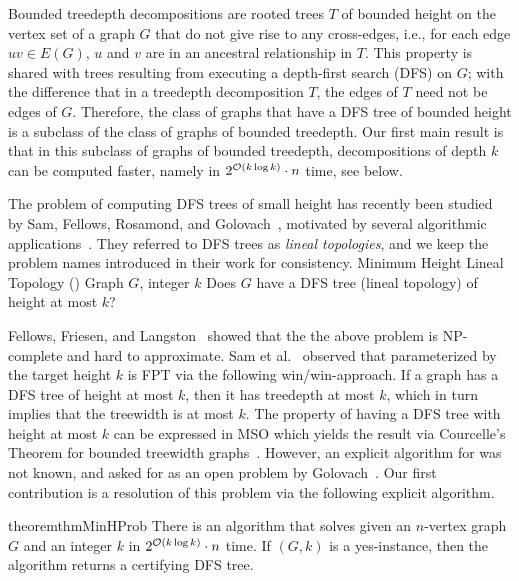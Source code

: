 \documentclass[a4paper,11pt]{article}
\begin{document}
Bounded treedepth decompositions are rooted trees $T$ of bounded height 
on the vertex set of a graph $G$ that do not give rise to any cross-edges, 
i.e., for each edge $uv \in E(G)$, $u$ and $v$ are in an ancestral relationship in $T$. 
This property is shared with trees resulting from executing a depth-first search (DFS) on $G$;
with the difference that in a treedepth decomposition $T$, the edges of $T$ need not be edges of $G$.
Therefore, the class of graphs that have a DFS tree of bounded height is a subclass of the class of graphs of bounded treedepth.
%
Our first main result is that in this subclass of graphs of bounded treedepth, 
decompositions of depth $k$ can be computed faster, 
namely in $2^{{\mathcal{O}}(k \log k)}\cdot n$ time, see below.

The problem of computing DFS trees of small height has recently been studied 
by Sam, Fellows, Rosamond, and Golovach~\cite{SamFRG23},
motivated by several algorithmic applications~\cite{BODLAENDER19931,downeyFellow2013,fellows1989Polytime,freuder1985}.
They referred to DFS trees as \emph{lineal topologies},
and we keep the problem names introduced in their work for consistency.
%
\fancyproblemdef
    {Minimum Height Lineal Topology (\MinHProb)}
    {Graph $G$, integer $k$}
    {Does $G$ have a DFS tree (lineal topology) of height at most $k$?}

Fellows, Friesen, and Langston~\cite{fellows1988} showed that the the above problem is NP-complete
and hard to approximate.
%
Sam et al.~\cite{SamFRG23} observed that \MinHProb parameterized by the target height $k$ is FPT via the following win/win-approach.
If a graph has a DFS tree of height at most $k$, then it has treedepth at most $k$, which in turn implies that the treewidth is at most $k$.
%
The property of having a DFS tree with height at most $k$ can be expressed in MSO which yields the result via Courcelle's Theorem for bounded treewidth graphs~\cite{Courcelle90}.
%
However, an explicit algorithm for \MinHProb was not known, and asked for as an open problem by Golovach~\cite{DagstuhlDrawing}.
Our first contribution is a resolution of this problem via the following explicit algorithm.
%
\begin{restatable}{theorem}{thmMinHProb}\label{thm:fpt-td2}
    There is an algorithm that solves \MinHProb 
    given an $n$-vertex graph $G$ and an integer $k$ 
    in $2^{{\mathcal{O}}(k \log k)} \cdot n$ time.
    If $(G, k)$ is a yes-instance, 
    then the algorithm returns a certifying DFS tree.
\end{restatable}
\end{document}
